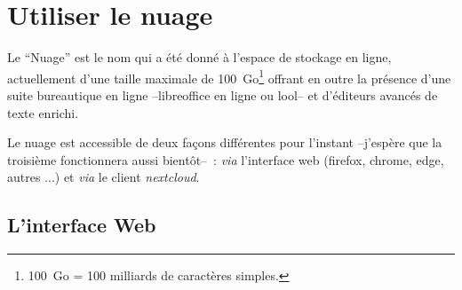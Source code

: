 \chapter*{Utiliser le nuage}

Le ``Nuage'' est le nom qui a été donné à l'espace de stockage en ligne, actuellement d'une taille maximale de 100~Go\footnote{%
100~Go = 100 milliards de caractères simples.
} 
offrant en outre la présence d'une suite bureautique en ligne --libreoffice en ligne ou lool-- et d'éditeurs avancés de texte enrichi.

Le nuage est accessible de deux façons différentes pour l'instant --j'espère que la troisième fonctionnera aussi bientôt--~: \emph{via} l'interface web (firefox, chrome, edge, autres ...) et \emph{via} le client \emph{nextcloud}.

\section*{L'interface Web}

